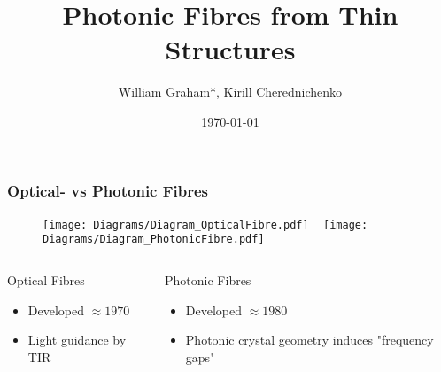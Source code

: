 \documentclass{beamer}
\title{Photonic Fibres from Thin Structures}
\author{William Graham*, Kirill Cherednichenko}
\institute{BUC-XVI, UNAM}
\date{\today}
\begin{document}
 
\frame{\titlepage}
 

\begin{frame}
	\frametitle{Optical- vs Photonic Fibres}
	
	\begin{figure}[t]
		\centering
		\texttt{[image: Diagrams/Diagram\_OpticalFibre.pdf]}
		~
		\texttt{[image: Diagrams/Diagram\_PhotonicFibre.pdf]}
	\end{figure}
	\begin{columns}
		\begin{column}{0.45\textwidth}
			\begin{block}{Optical Fibres}
				\begin{itemize}
					\item Developed $\approx 1970$
					\item Light guidance by TIR
				\end{itemize}
			\end{block}
		\end{column}
		\begin{column}{0.45\textwidth}
			\begin{block}{Photonic Fibres}
				\begin{itemize}
					\item Developed $\approx 1980$
					\item Photonic crystal geometry induces "frequency gaps"
				\end{itemize}
			\end{block}
		\end{column}
	\end{columns}
\end{frame} 
\end{document}
